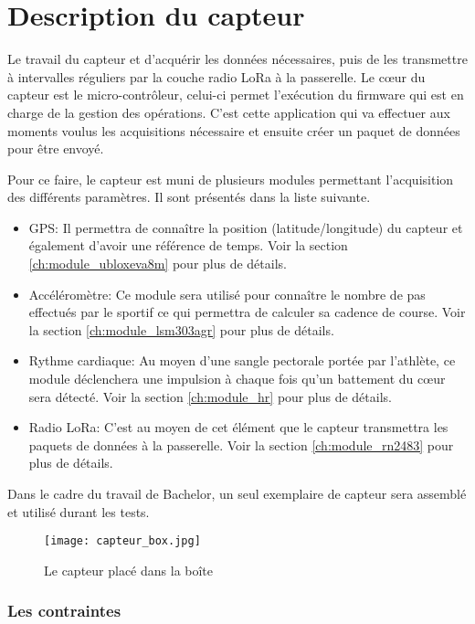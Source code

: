 \chapter{Description du capteur}\label{ch:capteur}

Le travail du capteur et d'acquérir les données nécessaires, puis de les transmettre à intervalles réguliers par la couche radio LoRa à la passerelle. Le cœur du capteur est le micro-contrôleur, celui-ci permet l'exécution du firmware qui est en charge de la gestion des opérations. C'est cette application qui va effectuer aux moments voulus les acquisitions nécessaire et ensuite créer un paquet de données pour être envoyé.

Pour ce faire, le capteur est muni de plusieurs modules permettant l'acquisition des différents paramètres. Il sont présentés dans la liste suivante.

\begin{itemize}
\item GPS: Il permettra de connaître la position (latitude/longitude) du capteur et également d'avoir une référence de temps. Voir la section \ref{ch:module_ubloxeva8m} pour plus de détails.
\item Accéléromètre: Ce module sera utilisé pour connaître le nombre de pas effectués par le sportif ce qui permettra de calculer sa cadence de course. Voir la section \ref{ch:module_lsm303agr} pour plus de détails.
\item Rythme cardiaque:  Au moyen d'une sangle pectorale portée par l'athlète, ce module déclenchera une impulsion à chaque fois qu'un battement du cœur sera détecté. Voir la section \ref{ch:module_hr} pour plus de détails.
\item Radio LoRa: C'est au moyen de cet élément que le capteur transmettra les paquets de données à la passerelle. Voir la section \ref{ch:module_rn2483} pour plus de détails.
\end{itemize}

Dans le cadre du travail de Bachelor, un seul exemplaire de capteur sera assemblé et utilisé durant les tests.

\begin{figure}[htb]
\centering 
\texttt{[image: capteur\_box.jpg]} 
\caption{Le capteur placé dans la boîte}
\label{fig:sensor_box_full}
\end{figure}

\subsection{Les contraintes}

